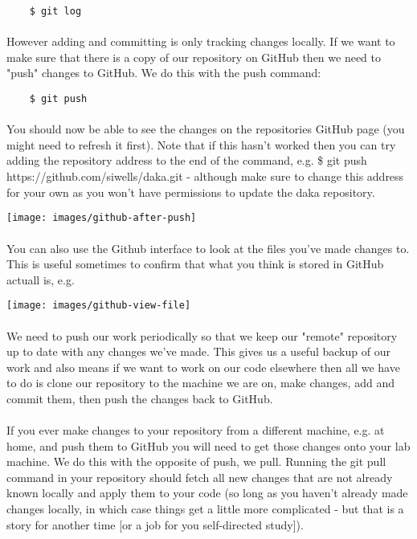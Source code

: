 \documentclass[10pt, a4paper]{article}
\begin{document}
\begin{lstlisting}
    $ git log
\end{lstlisting}

\paragraph{} However adding and committing is only tracking changes locally. If we want to make sure that there is a copy of our repository on GitHub then we need to "push" changes to GitHub. We do this with the push command:

\begin{lstlisting}
    $ git push
\end{lstlisting}

\paragraph{} You should now be able to see the changes on the repositories GitHub page (you might need to refresh it first). Note that if this hasn't worked then you can try adding the repository address to the end of the command, e.g. \$ git push https://github.com/siwells/daka.git - although make sure to change this address for your own as you won't have permissions to update the daka repository.

\texttt{[image: images/github-after-push]}

\paragraph{} You can also use the Github interface to look at the files you've made changes to. This is useful sometimes to confirm that what you think is stored in GitHub actuall is, e.g.

\texttt{[image: images/github-view-file]}

\paragraph{} We need to push our work periodically so that we keep our "remote" repository up to date with any changes we've made. This gives us a useful backup of our work and also means if we want to work on our code elsewhere then all we have to do is clone our repository to the machine we are on, make changes, add and commit them, then push the changes back to GitHub.

\paragraph{} If you ever make changes to your repository from a different machine, e.g. at home, and push them to GitHub you will need to get those changes onto your lab machine. We do this with the opposite of push, we pull. Running the git pull command in your repository should fetch all new changes that are not already known locally and apply them to your code (so long as you haven't already made changes locally, in which case things get a little more complicated - but that is a story for another time [or a job for you self-directed study]).
\end{document}
